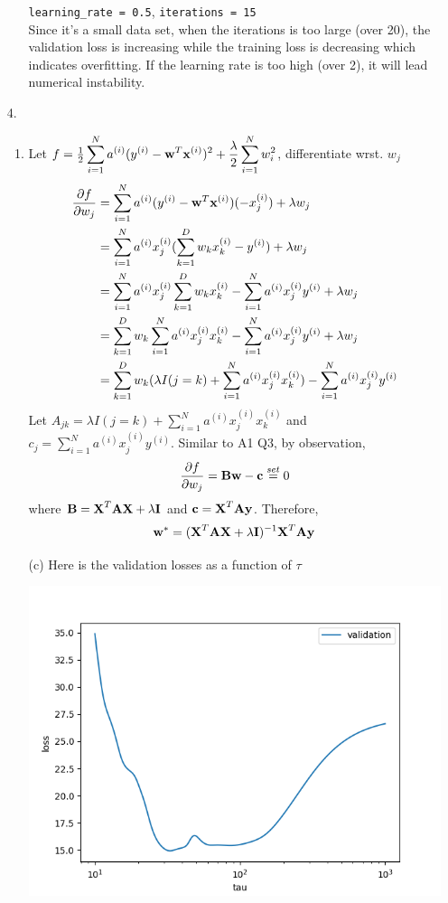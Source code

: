 \documentclass[12pt]{article}
\begin{document}
\begin{enumerate}
\begin{enumerate}
\begin{center}
        \end{center}
        \texttt{learning\_rate = 0.5}, \texttt{iterations = 15} \\
        Since it's a small data set, when the iterations is too large (over 20), the validation loss is increasing while the training loss is decreasing which indicates overfitting. If the learning rate is too high (over 2), it will lead numerical instability.
    \end{enumerate}
    \item[4.] \begin{enumerate}
      \item Let $f = \frac 1 2 \displaystyle\sum_{i=1}^N a^{(i)}(y^{(i)}-\textbf w^T \textbf x^{(i)})^2 + \frac \lambda 2 \sum_{i=1}^N w_i^2$, differentiate wrst. $w_j$
      \begin{align*}
        \frac{\partial f}{\partial w_j} &= \sum_{i=1}^N a^{(i)}(y^{(i)}-\textbf w^T \textbf x^{(i)})(-x_j^{(i)}) + \lambda w_j \\
        &= \sum_{i=1}^N a^{(i)}x_j^{(i)}(\sum_{k=1}^D w_k x_k^{(i)} - y^{(i)}) + \lambda w_j \\
        &= \sum_{i=1}^N a^{(i)}x_j^{(i)}\sum_{k=1}^D w_k x_k^{(i)} - \sum_{i=1}^N a^{(i)}x_j^{(i)} y^{(i)} + \lambda w_j \\
        &= \sum_{k=1}^D w_k \sum_{i=1}^N a^{(i)}x_j^{(i)} x_k^{(i)} - \sum_{i=1}^N a^{(i)}x_j^{(i)} y^{(i)} + \lambda w_j  \\
        &= \sum_{k=1}^D w_k (\lambda I(j = k) + \sum_{i=1}^N a^{(i)}x_j^{(i)} x_k^{(i)}) - \sum_{i=1}^N a^{(i)}x_j^{(i)} y^{(i)}
      \end{align*}
      Let $A_{jk} = \lambda I(j = k) + \sum_{i=1}^N a^{(i)}x_j^{(i)} x_k^{(i)}$ and
      $c_j = \sum_{i=1}^N a^{(i)}x_j^{(i)} y^{(i)}$.
      Similar to A1 Q3, by observation,
      $$\frac{\partial f}{\partial w_j} = \textbf B \textbf w - \textbf c \overset{set}{=} 0$$
      where $\textbf B = \textbf X^T \textbf A \textbf X + \lambda \textbf I$ and $\textbf c = \textbf X^T \textbf A \textbf y$. Therefore,
      $$\textbf w^* = (\textbf X^T \textbf A \textbf X + \lambda \textbf I)^{-1} \textbf X^T \textbf A \textbf y$$
      \item[(c)] Here is the validation losses as a function of $\tau$
      \begin{center}
        \includegraphics[scale=0.7]{q4.png}

\end{center}
\end{enumerate}
\end{enumerate}
\end{document}
